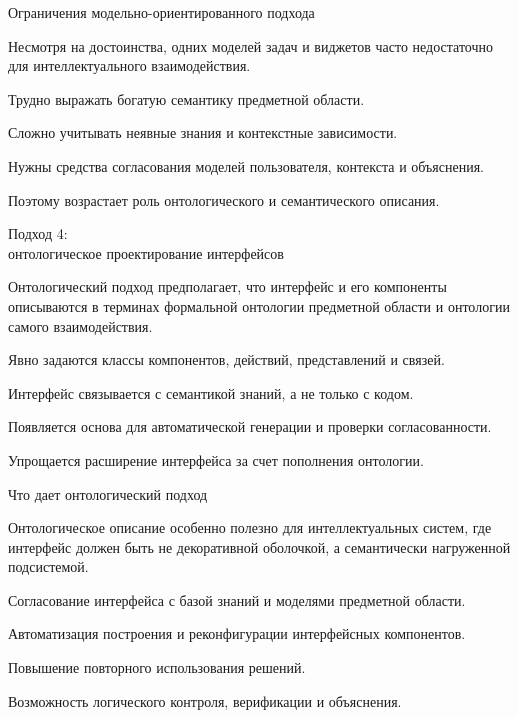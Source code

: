 \begin{frame}{Ограничения модельно-ориентированного подхода}
	\topline
	\justifying

	Несмотря на достоинства, одних моделей задач и виджетов часто недостаточно для интеллектуального взаимодействия.
	
	\begin{textitemize}
		\item Трудно выражать богатую семантику предметной области.
		\item Сложно учитывать неявные знания и контекстные зависимости.
		\item Нужны средства согласования моделей пользователя, контекста и объяснения.
		\item Поэтому возрастает роль онтологического и семантического описания.
	\end{textitemize}
\end{frame}

\begin{frame}{Подход 4:\\ онтологическое проектирование интерфейсов}
	\topline
	\justifying

	Онтологический подход предполагает, что интерфейс и его компоненты описываются в терминах формальной онтологии предметной области и онтологии самого взаимодействия.
	
	\begin{textitemize}
		\item Явно задаются классы компонентов, действий, представлений и связей.
		\item Интерфейс связывается с семантикой знаний, а не только с кодом.
		\item Появляется основа для автоматической генерации и проверки согласованности.
		\item Упрощается расширение интерфейса за счет пополнения онтологии.
	\end{textitemize}
\end{frame}

\begin{frame}{Что дает онтологический подход}
	\topline
	\justifying

	Онтологическое описание особенно полезно для интеллектуальных систем, где интерфейс должен быть не декоративной оболочкой, а семантически нагруженной подсистемой.
	
	\begin{textitemize}
		\item Согласование интерфейса с базой знаний и моделями предметной области.
		\item Автоматизация построения и реконфигурации интерфейсных компонентов.
		\item Повышение повторного использования решений.
		\item Возможность логического контроля, верификации и объяснения.
	\end{textitemize}
\end{frame}


